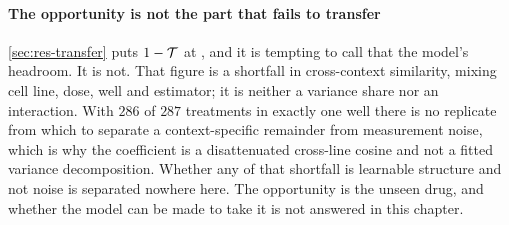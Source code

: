 \paragraph{The opportunity is not the part that fails to transfer}
\cref{sec:res-transfer} puts $1 - \mathcal{T}$ at , and it
is tempting to call that the model's headroom. It is not. That figure is a
shortfall in cross-context similarity, mixing cell line, dose, well and
estimator; it is neither a variance share nor an interaction. With $286$ of $287$
treatments in exactly one well there is no replicate from which to separate a
context-specific remainder from measurement noise, which is why the coefficient
is a disattenuated cross-line cosine and not a fitted variance
decomposition. Whether any of that shortfall is learnable structure and not noise is
separated nowhere here. The opportunity is the unseen drug, and whether the model
can be made to take it is not answered in this chapter.

